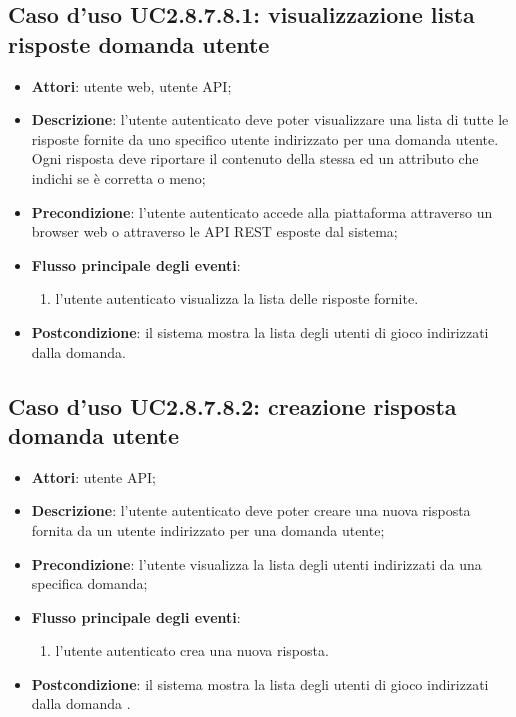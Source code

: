 \subsection{Caso d'uso UC2.8.7.8.1: visualizzazione lista risposte domanda utente}
\begin{itemize}
\item \textbf{Attori}: utente web, utente API;
\item \textbf{Descrizione}: l'utente autenticato deve poter visualizzare una lista di tutte le risposte fornite da uno specifico utente indirizzato per una domanda utente. Ogni risposta deve riportare il contenuto della stessa ed un attributo che indichi se è corretta o meno; 
      \item \textbf{Precondizione}: l'utente autenticato accede alla piattaforma attraverso un browser web o attraverso le API REST esposte dal sistema;

        \item \textbf{Flusso principale degli eventi}:
          \begin{enumerate}
          \item l'utente autenticato visualizza la lista delle risposte fornite.

      \end{enumerate}
    \item \textbf{Postcondizione}: il sistema mostra la lista degli utenti di gioco indirizzati dalla domanda.
  \end{itemize}
\hypertarget{UC2.8.7.8.2}{}
\subsection{Caso d'uso UC2.8.7.8.2: creazione risposta domanda utente}
\begin{itemize}
\item \textbf{Attori}: utente API;
\item \textbf{Descrizione}: l'utente autenticato  deve poter creare una nuova risposta fornita da un utente indirizzato per una domanda utente; 
      \item \textbf{Precondizione}: l'utente visualizza la lista degli utenti indirizzati da una specifica domanda;

        \item \textbf{Flusso principale degli eventi}:
          \begin{enumerate}
          \item l'utente autenticato crea una nuova risposta.

      \end{enumerate}
    \item \textbf{Postcondizione}: il sistema mostra la lista degli utenti di gioco indirizzati dalla domanda
.
  \end{itemize}
\hypertarget{UC2.9}{}
